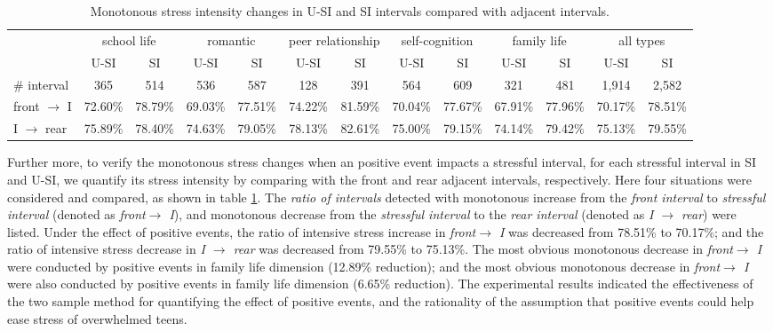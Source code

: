 \begin{table}
\begin{center}
\caption{\small{Monotonous stress intensity changes in U-SI and SI intervals compared with adjacent intervals.}}
\small{
\begin{tabular}{l cccccc cccccc} \\\hline\hline
\multirow{2}{1cm}{}
&\multicolumn{2}{c}{school life}
&\multicolumn{2}{c}{romantic}
&\multicolumn{2}{c}{peer relationship}
&\multicolumn{2}{c}{self-cognition}
&\multicolumn{2}{c}{family life}
&\multicolumn{2}{c}{all types}\\
&U-SI	    &	SI	        &U-SI	    &SI	        &U-SI	   &SI	
&U-SI	    &	SI	        &	U-SI	&SI	        &U-SI	   &SI\\  \hline
\# interval         &   365	        &	514	        &	536	        &	587	        &128	    &	391	        &	564	           &	609	            &	321	        &	481	        &	1,914	    &2,582	 \\
front $\rightarrow$ I &	72.60\% &	78.79\% &	69.03\% 	&77.51\%   &74.22\%    &81.59\%    &70.04\%    &77.67\%  &67.91\%     &77.96\%    &70.17\%    &78.51\% \\
I $\rightarrow$ rear  &	75.89\% &	78.40\% &	74.63\% 	&79.05\%   &78.13\%    &82.61\%    &75.00\%    &79.15\%   &74.14\%    &79.42\%    &75.13\%    & 79.55\%\\ \hline \hline
\end{tabular}}%
\label{tab:fontrear}
\end{center}
\end{table}

Further more,
to verify the monotonous stress changes when an positive event impacts a stressful interval,
for each stressful interval in SI and U-SI,
we quantify its stress intensity by comparing with the front and rear adjacent intervals, respectively.
Here four situations were considered and compared,
as shown in table \ref{tab:fontrear}.
The \emph{ratio of intervals} detected with monotonous increase from the \emph{front interval} to \emph{stressful interval} (denoted as \emph{front$ \rightarrow$ I}),
and monotonous decrease from the \emph{stressful interval} to the \emph{rear interval} (denoted as \emph{I $\rightarrow$ rear}) were listed.
Under the effect of positive events,
the ratio of intensive stress increase in \emph{front$ \rightarrow$ I} was decreased from 78.51\% to 70.17\%;
and the ratio of intensive stress decrease in \emph{I $\rightarrow$ rear} was decreased from 79.55\% to 75.13\%.
The most obvious monotonous decrease in \emph{front$ \rightarrow$ I} were conducted by positive events in family life dimension (12.89\% reduction);
and the most obvious monotonous decrease in \emph{front$ \rightarrow$ I} were also conducted by positive events in family life dimension (6.65\% reduction).
The experimental results indicated the effectiveness of the two sample method for quantifying the effect of positive events,
and the rationality of the assumption that positive events could help ease stress of overwhelmed teens.

